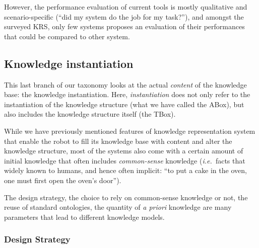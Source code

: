 \documentclass[a4paper, twocolumn]{article}
\newcommand{\ie}{{\textit{i.e.\ }}}
\begin{document}
However, the performance evaluation of current tools is mostly qualitative and
scenario-specific (``did my system do the job for my task?''), and amongst the
surveyed KRS, only few systems proposes an evaluation of their performances
that could be compared to other system.

\subsection{Knowledge instantiation}

\begin{scriptsize}
\begin{center}
\end{center}
\end{scriptsize}

This last branch of our taxonomy looks at the actual \emph{content} of the
knowledge base: the knowledge instantiation. Here, \emph{instantiation} does
not only refer to the instantiation of the knowledge structure (what we have
called the ABox), but also includes the knowledge structure itself (the TBox).

While we have previously mentioned features of knowledge representation system
that enable the robot to fill its knowledge base with content and alter the
knowledge structure, most of the systems also come with a certain amount of
initial knowledge that often includes \emph{common-sense} knowledge (\ie facts
that widely known to humans, and hence often implicit: ``to put a cake in the
oven, one must first open the oven's door'').

The design strategy, the choice to rely on common-sense knowledge or not, the
reuse of standard ontologies, the quantity of {\it a priori} knowledge are many
parameters that lead to different knowledge models.

\subsubsection{Design Strategy}
\label{sect|design-strategies}
\end{document}
